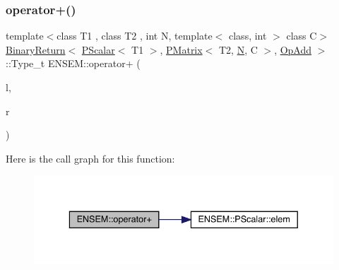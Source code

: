\subsubsection{\texorpdfstring{operator+()}{operator+()}\hspace{0.1cm}{\footnotesize\ttfamily [4/4]}}
{\footnotesize\ttfamily template$<$class T1 , class T2 , int N, template$<$ class, int $>$ class C$>$ \\
\mbox{\hyperlink{structENSEM_1_1BinaryReturn}{Binary\+Return}}$<$ \mbox{\hyperlink{classENSEM_1_1PScalar}{P\+Scalar}}$<$ T1 $>$, \mbox{\hyperlink{classENSEM_1_1PMatrix}{P\+Matrix}}$<$ T2, \mbox{\hyperlink{adat__devel_2lib_2hadron_2operator__name__util_8cc_a7722c8ecbb62d99aee7ce68b1752f337}{N}}, C $>$, \mbox{\hyperlink{structENSEM_1_1OpAdd}{Op\+Add}} $>$\+::Type\+\_\+t E\+N\+S\+E\+M\+::operator+ (\begin{DoxyParamCaption}\item[{const \mbox{\hyperlink{classENSEM_1_1PScalar}{P\+Scalar}}$<$ T1 $>$ \&}]{l,  }\item[{const \mbox{\hyperlink{classENSEM_1_1PMatrix}{P\+Matrix}}$<$ T2, \mbox{\hyperlink{adat__devel_2lib_2hadron_2operator__name__util_8cc_a7722c8ecbb62d99aee7ce68b1752f337}{N}}, C $>$ \&}]{r }\end{DoxyParamCaption})\hspace{0.3cm}{\ttfamily [inline]}}

Here is the call graph for this function\+:\nopagebreak
\begin{figure}[H]
\begin{center}
\leavevmode
\includegraphics[width=336pt]{df/d0a/group__primmatrix_ga39561cdaedaf3bb4fb108575dae42de6_cgraph}
\end{center}
\end{figure}
\mbox{\label{group__primmatrix_ga76960c32943a9f55860945f47f02de5b}} 
